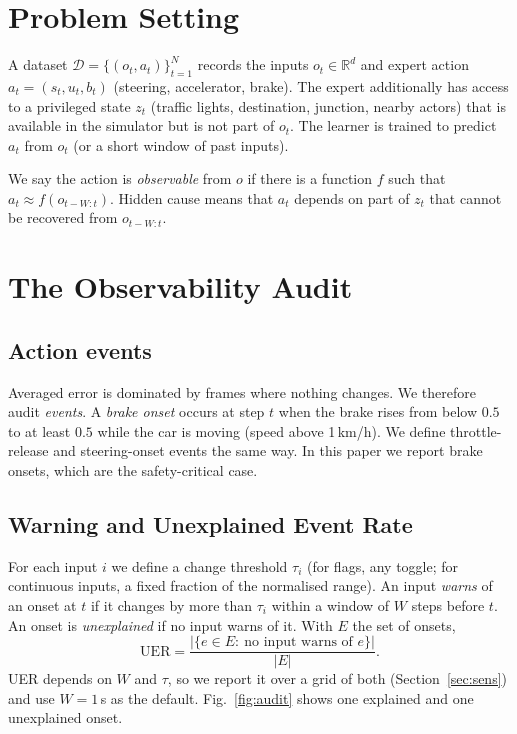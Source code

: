 \documentclass[conference]{IEEEtran}
\begin{document}
\section{Problem Setting}

A dataset $\mathcal{D}=\{(o_t,a_t)\}_{t=1}^{N}$ records the inputs
$o_t\in\mathbb{R}^{d}$ and expert action $a_t=(s_t,u_t,b_t)$ (steering,
accelerator, brake). The expert additionally has access to a
privileged state $z_t$ (traffic lights, destination, junction, nearby
actors) that is available in the simulator but is not part of $o_t$.
The learner is trained to predict $a_t$ from $o_t$ (or a short window
of past inputs).

We say the action is \emph{observable} from $o$ if there is a function
$f$ such that $a_t\approx f(o_{t-W:t})$. Hidden cause means that $a_t$
depends on part of $z_t$ that cannot be recovered from $o_{t-W:t}$.

\section{The Observability Audit}\label{sec:audit}

\subsection{Action events}

Averaged error is dominated by frames where nothing changes. We
therefore audit \emph{events}. A \emph{brake onset} occurs at step $t$
when the brake rises from below $0.5$ to at least $0.5$ while the car is
moving (speed above 1\,km/h). We define throttle-release and
steering-onset events the same way. In this paper we report brake
onsets, which are the safety-critical case.

\subsection{Warning and Unexplained Event Rate}

For each input $i$ we define a change threshold $\tau_i$ (for flags,
any toggle; for continuous inputs, a fixed fraction of the normalised
range). An input \emph{warns} of an onset at $t$ if it changes by more
than $\tau_i$ within a window of $W$ steps before $t$. An onset is
\emph{unexplained} if no input warns of it. With $E$ the set of onsets,
\begin{equation}
\mathrm{UER}=\frac{\left|\{e\in E:\ \text{no input warns of }e\}\right|}{|E|}.
\label{eq:uer}
\end{equation}
UER depends on $W$ and $\tau$, so we report it over a grid of both
(Section~\ref{sec:sens}) and use $W=1$\,s as the default.
Fig.~\ref{fig:audit} shows one explained and one unexplained onset.
\end{document}
